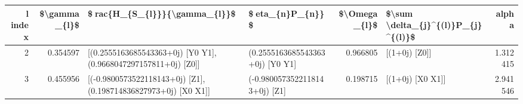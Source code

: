 \begin{tabular}{rrllrlr}
\toprule
 l index &  \$\textbackslash gamma\_\{l\}\$ &                                    \$rac\{H\_\{S\_\{l\}\}\}\{\textbackslash gamma\_\{l\}\}\$ &                 \$eta\_\{n\}P\_\{n\}\}\$ &  \$\textbackslash Omega\_\{l\}\$ & \$\textbackslash sum \textbackslash delta\_\{j\}\textasciicircum \{(l)\}P\_\{j\}\textasciicircum \{(l)\}\$ &     alpha \\
\midrule
       2 &      0.354597 &  [(0.2555163685543363+0j) [Y0 Y1], (0.9668047297157811+0j) [Z0]] &  (0.2555163685543363+0j) [Y0 Y1] &      0.966805 &                      [(1+0j) [Z0]] &  1.312415 \\
       3 &      0.455956 &  [(-0.9800573522118143+0j) [Z1], (0.198714836827973+0j) [X0 X1]] &    (-0.9800573522118143+0j) [Z1] &      0.198715 &                   [(1+0j) [X0 X1]] &  2.941546 \\
\bottomrule
\end{tabular}
